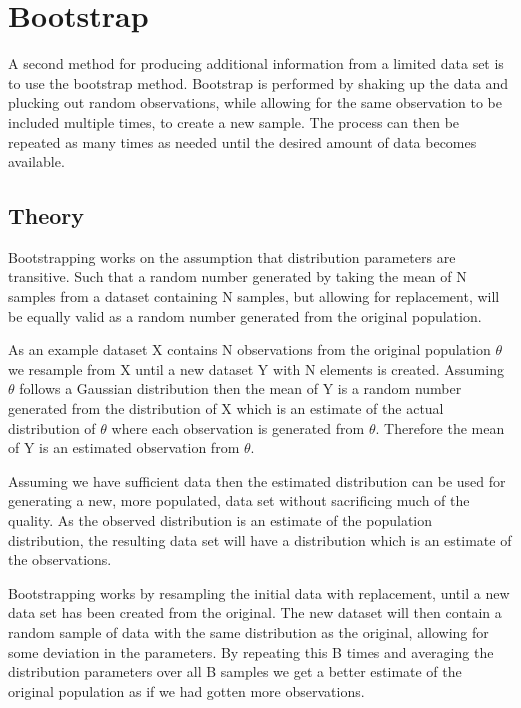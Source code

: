 \section{Bootstrap}\label{ch:bootstrap}

A second method for producing additional information from a limited data set is to use the bootstrap method. Bootstrap is performed by shaking up the data and plucking out random observations, while allowing for the same observation to be included multiple times, to create a new sample. The process can then be repeated as many times as needed until the desired amount of data becomes available. 

\subsection{Theory}

\iffalse
A good explanation https://stats.stackexchange.com/questions/26088/explaining-to-laypeople-why-bootstrapping-works
\fi

Bootstrapping works on the assumption that distribution parameters are transitive. Such that a random number generated by taking the mean of N samples from a dataset containing N samples, but allowing for replacement, will be equally valid as a random number generated from the original population.

As an example dataset X contains N observations from the original population $\theta$ we resample from X until a new dataset Y with N elements is created. Assuming $\theta$ follows a Gaussian distribution then the mean of Y is a random number generated from the distribution of X which is an estimate of the actual distribution of $\theta$ where each observation is generated from $\theta$. Therefore the mean of Y is an estimated observation from $\theta$.

Assuming we have sufficient data then the estimated distribution can be used for generating a new, more populated, data set without sacrificing much of the quality. As the observed distribution is an estimate of the population distribution, the resulting data set will have a distribution which is an estimate of the observations.

\iffalse %
Bootstrapping works by resampling the initial data with replacement, until a new data set has been created from the original. The new dataset will then contain a random sample of data with the same distribution as the original, allowing for some deviation in the parameters. By repeating this B times and averaging the distribution parameters over all B samples we get a better estimate of the original population as if we had gotten more observations.

